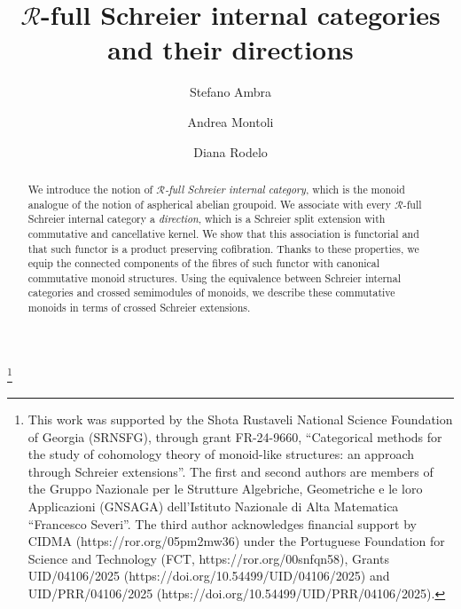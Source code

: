 \documentclass[a4paper]{amsart}
\theoremstyle{plain}
\theoremstyle{definition}
\theoremstyle{remark}
\begin{document}
\title[The direction of $\mathcal{R}$-full Schreier internal categories]{$\mathcal{R}$-full Schreier internal categories and their directions}

\author[S.~Ambra]{Stefano Ambra}
\address[Stefano Ambra]{Dipartimento di Matematica ``Federigo Enriques'', Universit\`{a} degli Studi di Milano, Via Saldini 50, 20133 Milano, Italy}

\author[A.~Montoli]{Andrea Montoli}
\address[Andrea Montoli]{Dipartimento di Matematica ``Federigo Enriques'', Universit\`{a} degli Studi di Milano, Via Saldini 50, 20133 Milano, Italy}

\author[D.~Rodelo]{Diana Rodelo}
\address[Diana Rodelo]{Department of Mathematics, University of the Algarve, 8005-139 Faro, Portugal and Center for Research and Development in Mathematics and Applications (CIDMA), Department of Mathematics, University of Aveiro, 3810-193 Aveiro, Portugal} 

\thanks{This work was supported by the Shota Rustaveli National Science Foundation of Georgia (SRNSFG), through grant FR-24-9660, ``Categorical methods for the study of cohomology theory of monoid-like structures: an approach through Schreier extensions''.
The first and second authors are members of the Gruppo Nazionale per le Strutture Algebriche, Geometriche e le loro Applicazioni (GNSAGA) dell'Istituto Nazionale di Alta Matematica ``Francesco Severi''.
The third author acknowledges financial support by CIDMA (https://ror.org/05pm2mw36)
under the Portuguese Foundation for Science and Technology
(FCT, https://ror.org/00snfqn58), Grants UID/04106/2025 (https://doi.org/10.54499/UID/04106/2025)
and UID/PRR/04106/2025 (https://doi.org/10.54499/UID/PRR/04106/2025).}

\begin{abstract}
We introduce the notion of \emph{$\mathcal{R}$-full Schreier internal category}, which is the monoid analogue of the notion of aspherical abelian groupoid. We associate with every $\mathcal{R}$-full Schreier internal category a \emph{direction}, which is a Schreier split extension with commutative and cancellative kernel. We show that this association is functorial and that such functor is a product preserving cofibration. Thanks to these properties, we equip the connected components of the fibres of such functor with canonical commutative monoid structures. Using the equivalence between Schreier internal categories and crossed semimodules of monoids, we describe these commutative monoids in terms of crossed Schreier extensions.
\end{abstract}
\end{document}
